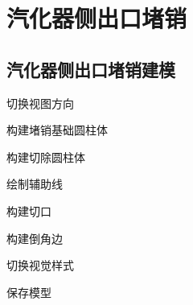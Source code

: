 \chapter{汽化器侧出口堵销}
\section{汽化器侧出口堵销建模}
\begin{procedure}
\item 切换视图方向
\item 构建堵销基础圆柱体
\item 构建切除圆柱体
\item 绘制辅助线
\item 构建切口
\item 构建倒角边
\item 切换视觉样式
\item 保存模型
\end{procedure}
